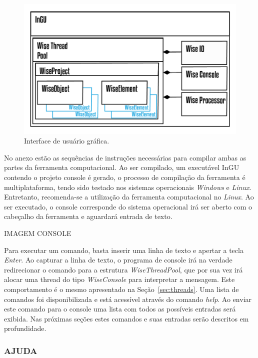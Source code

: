 \documentclass[a4paper,12pt]{monografia}
\theoremstyle{plain}
\theoremstyle{definition}
\theoremstyle{remark}
\begin{document}
\begin{figure}[!htbp]
	\centering
	\includegraphics[scale=1]{Figures/InGU.png}
	\caption{Interface de usuário gráfica.}
	\label{fig10:console}
\end{figure}

No anexo estão as sequências de instruções necessárias para compilar ambas as partes da ferramenta computacional. Ao ser compilado, um executável InGU contendo o projeto console é gerado, o processo de compilação da ferramenta é multiplataforma, tendo sido testado nos sistemas operacionais \textit{Windows} e \textit{Linux}. Entretanto, recomenda-se a utilização da ferramenta computacional no \textit{Linux}. Ao ser executado, o console corresponde do sistema operacional irá ser aberto com o cabeçalho da ferramenta e aguardará entrada de texto.

IMAGEM CONSOLE

Para executar um comando, basta inserir uma linha de texto e apertar a tecla \textit{Enter}.  Ao capturar a linha de texto, o programa de console irá na verdade redirecionar o comando para a estrutura \textit{WiseThreadPool}, que por sua vez irá alocar uma thread do tipo \textit{WiseConsole} para interpretar a mensagem. Este comportamento é o mesmo apresentado na Seção~\ref{sec:threads}. Uma lista de comandos foi disponibilizada e está acessível através do comando \textit{help}. Ao enviar este comando para o console uma lista com todos as possíveis entradas será exibida. Nas próximas seções estes comandos e suas entradas serão descritos em profundidade.

\subsubsection{AJUDA}\label{sec:help}
\end{document}
